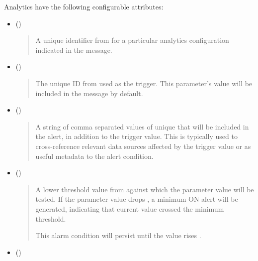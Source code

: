 \documentclass[letterpaper,10pt,english]{sphinxmanual}
\begin{document}
Analytics have the following configurable attributes:
\begin{itemize}
\item {} 
 ()
\begin{quote}

A unique identifier from  for a particular analytics configuration indicated in the  message.
\end{quote}

\item {} 
 ()
\begin{quote}

The unique  ID from  used as the  trigger.
This parameter’s value will be included in the  message by default.
\end{quote}

\item {} 
 ()
\begin{quote}

A string of comma separated values of unique  that will be included in the alert, in addition to the trigger value.
This is typically used to cross-reference relevant data sources affected by the trigger value or as useful metadata to the alert condition.
\end{quote}

\item {} 
 ()
\begin{quote}

A lower threshold value from  against which the parameter value will be tested.
If the parameter value drops , a minimum ON alert {\hyperref[\detokenize{otaapi:paramalerton}]{}} will be generated, indicating that current value crossed the minimum threshold.

This alarm condition will persist until the value rises .
\end{quote}

\item {} 
 ()
\begin{quote}


\end{quote}
\end{itemize}
\end{document}
